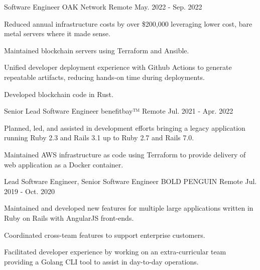 

\begin{cventries}

  \cventry
    {Software Engineer} %
    {OAK Network} %
    {Remote} %
    {May. 2022 - Sep. 2022} %
    {
      \begin{cvitems} %
        \item {Reduced annual infrastructure costs by over \$200,000 leveraging lower cost, bare metal servers where it made sense.}
        \item {Maintained blockchain servers using Terraform and Ansible.}
        \item {Unified developer deployment experience with Github Actions to generate repeatable artifacts, reducing hands-on time during deployments.}
        \item {Developed blockchain code in Rust.}
      \end{cvitems}
    }

  \cventry
    {Senior Lead Software Engineer} %
    {benefitbay™} %
    {Remote} %
    {Jul. 2021 - Apr. 2022} %
    {
      \begin{cvitems} %
        \item {Planned, led, and assisted in development efforts bringing a legacy application running Ruby 2.3 and Rails 3.1 up to Ruby 2.7 and Rails 7.0.}
        \item {Maintained AWS infrastructure as code using Terraform to provide delivery of web application as a Docker container.}
      \end{cvitems}
    }

  \cventry
    {Lead Software Engineer, Senior Software Engineer} %
    {BOLD PENGUIN} %
    {Remote} %
    {Jul. 2019 - Oct. 2020} %
    {
      \begin{cvitems} %
        \item {Maintained and developed new features for multiple large applications written in Ruby on Rails with AngularJS front-ends.}
        \item {Coordinated cross-team features to support enterprise customers.}
        \item {Facilitated developer experience by working on an extra-curricular team providing a Golang CLI tool to assist in day-to-day operations.}
      \end{cvitems}
    }


\end{cventries}
